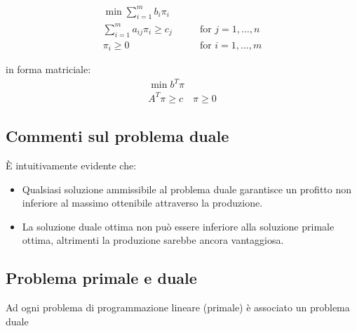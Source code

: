 \documentclass[a4paper, 11pt]{article}
\begin{document}
            \begin{align*}
                \min \sum_{i=1}^{m} b_i \pi_i & \\
                \sum_{i=1}^{m} a_{ij} \pi_i \geq c_j \qquad & \text{for } j = 1, \dots, n \\
                \pi_i \geq 0 \qquad & \text{for } i = 1, \dots, m
            \end{align*}
                
            in forma matriciale:
            \begin{align*}
                \min b^T \pi \\
                A^T \pi \geq c
                \quad \pi \geq 0
            \end{align*}

        \subsection*{Commenti sul problema duale}

            È intuitivamente evidente che:

            \begin{itemize}
                \item Qualsiasi soluzione ammissibile al problema duale garantisce un profitto non inferiore al massimo ottenibile attraverso la produzione.
                \item La soluzione duale ottima non può essere inferiore alla soluzione primale ottima, altrimenti la produzione sarebbe ancora vantaggiosa.
            \end{itemize}

        \subsection{Problema primale e duale}            
                        
            \noindent Ad ogni problema di programmazione lineare (primale) è associato un problema duale
\end{document}
